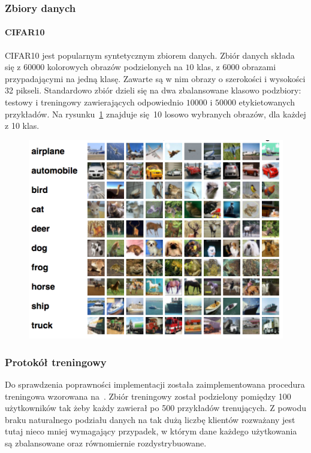   \subsubsection{Zbiory danych}
  \paragraph{CIFAR10}
  CIFAR10 jest popularnym syntetycznym zbiorem danych. Zbiór danych składa się z \(\num{60000}\)
  kolorowych obrazów podzielonych na \(\num{10}\) klas, z \(\num{6000}\) obrazami przypadającymi
  na jedną klasę. Zawarte są w nim obrazy o szerokości i wysokości 32 pikseli. Standardowo zbiór
  dzieli się na dwa zbalansowane klasowo podzbiory: testowy i treningowy zawierających odpowiednio
  \(10000\) i \(50000\) etykietowanych przykładów. Na rysunku~\ref{fig:cifar10_example} znajduje się 10 losowo wybranych obrazów, dla każdej z 10 klas.

  \begin{figure}[h]
    \centering
    \includegraphics[width=1.0\textwidth]{img/cifar10_example.png}
    \label{fig:cifar10_example}
  \end{figure}

  \subsubsection{Protokół treningowy}

  Do sprawdzenia poprawności implementacji została zaimplementowana procedura treningowa wzorowana
  na~\cite{FLBasic}. Zbiór treningowy został podzielony pomiędzy 100 użytkowników tak żeby każdy zawierał po 500 przykładów trenujących. Z powodu braku naturalnego podziału danych na tak dużą liczbę klientów rozważany jest tutaj nieco mniej wymagający przypadek, w którym dane każdego użytkowania są zbalansowane oraz równomiernie rozdystrybuowane.

